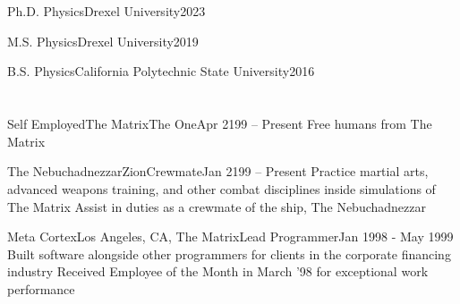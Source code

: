 \documentclass{resume}
\begin{document}

\section*{}
\begin{education}{Ph.D. Physics}{Drexel University}{2023}
\end{education}

\begin{education}{M.S. Physics}{Drexel University}{2019}
\end{education}

\begin{education}{B.S. Physics}{California Polytechnic State University}{2016}
\end{education}

\section*{}

\begin{job}{Self Employed}{The Matrix}{The One}{Apr 2199 -- Present}
	\bullet Free humans from The Matrix
\end{job}

\begin{job}{The Nebuchadnezzar}{Zion}{Crewmate}{Jan 2199 -- Present}
	\bullet Practice martial arts, advanced weapons training, and other combat
		disciplines inside simulations of The Matrix
	\bullet Assist in duties as a crewmate of the ship, The Nebuchadnezzar
\end{job}

\begin{job}{Meta Cortex}{Los Angeles, CA, The Matrix}{Lead Programmer}{Jan 1998 - May 1999}
	\bullet Built software alongside other programmers for clients in the
		corporate financing industry
	\bullet Received Employee of the Month in March '98 for exceptional work
		performance
\end{job}
\end{document}

